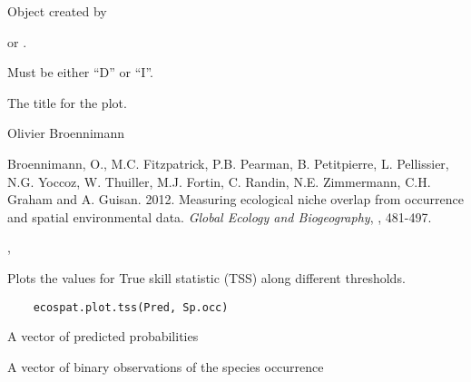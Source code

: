 \documentclass[a4paper]{book}
\begin{document}
%
\begin{Arguments}
\begin{ldescription}
\item[\code{x}] Object created by 

 or .
\item[\code{type}] Must be either ``D'' or ``I''.
\item[\code{title}] The title for the plot.
\end{ldescription}
\end{Arguments}
%
\begin{Author}\relax
Olivier Broennimann 
\end{Author}
%
\begin{References}\relax
Broennimann, O., M.C. Fitzpatrick, P.B. Pearman, B. Petitpierre, L. Pellissier, N.G. Yoccoz, W. Thuiller, M.J. Fortin, C. Randin, N.E. Zimmermann, C.H. Graham and A. Guisan. 2012. Measuring ecological niche overlap from occurrence and spatial environmental data. \emph{Global Ecology and Biogeography}, , 481-497.
\end{References}
%
\begin{SeeAlso}\relax
{}, 
\end{SeeAlso}
%
\begin{Description}\relax
Plots the values for True skill statistic (TSS) along different thresholds.
\end{Description}
%
\begin{Usage}
\begin{verbatim}
    ecospat.plot.tss(Pred, Sp.occ)
\end{verbatim}
\end{Usage}
%
\begin{Arguments}
\begin{ldescription}
\item[\code{Pred}] 
A vector of predicted probabilities

\item[\code{Sp.occ}] 
A vector of binary observations of the species occurrence

\end{ldescription}
\end{Arguments}
\end{document}
